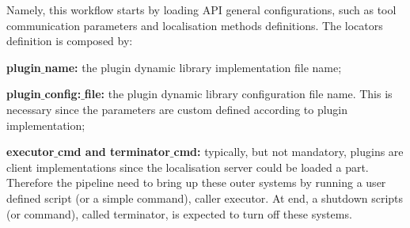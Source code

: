 Namely, this workflow starts by loading API general configurations, such as tool communication parameters and localisation methods definitions. The locators definition is composed by: 

\begin{figure}[h!]
\end{figure}

\begin{itemize_jp}
    \item \textbf{plugin$\_$name:} the plugin dynamic library implementation file name;
    \item \textbf{plugin$\_$config:$\_$file:} the plugin dynamic library configuration file name. This is necessary since the parameters are custom defined according to plugin implementation;
    \item \textbf{executor$\_$cmd and terminator$\_$cmd: } typically, but not mandatory, plugins are client implementations since the localisation server could be loaded a part. Therefore the pipeline need to bring up these outer systems by running a user defined script (or a simple command), caller executor. At end, a shutdown scripts (or command), called terminator, is expected to turn off these systems. 
\end{itemize_jp}

